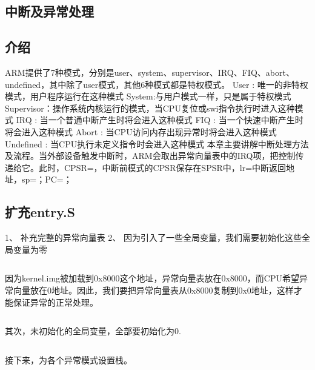 \documentclass[main.tex]{subfiles}
\begin{document}
\begin{CJK*}{UTF8}{song}

\chapter{中断及异常处理}
\section{介绍}
ARM提供了7种模式，分别是user、system、supervisor、IRQ、FIQ、abort、undefined，其中除了user模式，其他6种模式都是特权模式。
User : 唯一的非特权模式，用户程序运行在这种模式
System:与用户模式一样，只是属于特权模式
Supervisor：操作系统内核运行的模式，当CPU复位或swi指令执行时进入这种模式
IRQ :   当一个普通中断产生时将会进入这种模式
FIQ :   当一个快速中断产生时将会进入这种模式
Abort : 当CPU访问内存出现异常时将会进入这种模式
Undefined : 当CPU执行未定义指令时会进入这种模式
本章主要讲解中断处理方法及流程。当外部设备触发中断时，ARM会取出异常向量表中的IRQ项，把控制传递给它。此时，CPSR=，中断前模式的CPSR保存在SPSR中，lr=中断返回地址，sp=；PC=；

\section{扩充entry.S}
1、	补充完整的异常向量表
2、	因为引入了一些全局变量，我们需要初始化这些全局变量为零

\inputminted[firstline=71,lastline=104,linenos,numbersep=5pt,frame=lines,framesep=2mm]{gas}{chapter03/kernel/entry.S}

因为kernel.img被加载到0x8000这个地址，异常向量表放在0x8000，而CPU希望异常向量放在0地址。因此，我们要把异常向量表从0x8000复制到0x0地址，这样才能保证异常的正常处理。

\inputminted[firstline=104,lastline=112,linenos,numbersep=5pt,frame=lines,framesep=2mm]{gas}{chapter03/kernel/entry.S}

其次，未初始化的全局变量，全部要初始化为0.

\inputminted[firstline=112,lastline=121,linenos,numbersep=5pt,frame=lines,framesep=2mm]{gas}{chapter03/kernel/entry.S}

接下来，为各个异常模式设置栈。
\inputminted[firstline=121,lastline=143,linenos,numbersep=5pt,frame=lines,framesep=2mm]{gas}{chapter03/kernel/entry.S}


\end{CJK*}
\end{document}
